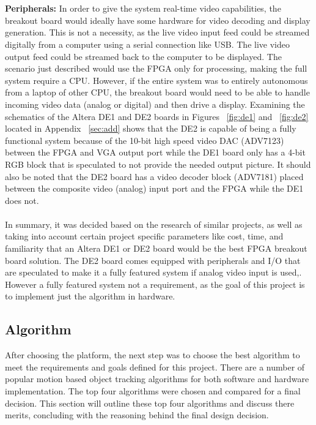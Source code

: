 \documentclass[12pt]{article} %
\begin{document}
\\\\
\textbf{Peripherals:} In order to give the system real-time video capabilities, the breakout board would ideally have some hardware for video decoding and display generation. This is not a necessity, as the live video input feed could be streamed digitally from a computer using  a serial connection like USB. The live video output feed could be streamed back to the computer to be displayed. The scenario just described would use the FPGA only for processing, making the full system require a CPU. However, if the entire system was to entirely autonomous from a laptop of other CPU, the breakout board would need to be able to handle incoming video data (analog or digital) and then drive a display. Examining the schematics of the Altera DE1 and DE2 boards in Figures ~\ref{fig:de1} and ~\ref{fig:de2} located in Appendix ~\ref{sec:add} shows that the DE2 is capable of being a fully functional system because of the 10-bit high speed video DAC (ADV7123) between the FPGA and VGA output port while the DE1 board only has a 4-bit RGB block that is speculated to not provide the needed output picture. It should also be noted that the DE2 board has a video decoder block (ADV7181) placed between the composite video (analog) input port and the FPGA while the DE1 does not.\\\\ 
In summary, it was decided based on the research of similar projects, as well as taking into account certain project specific parameters like cost, time, and familiarity that an Altera DE1 or DE2 board would be the best FPGA breakout board solution. The DE2 board comes equipped with peripherals and I/O that are speculated to make it a fully featured system if analog video input is used,. However a fully featured system not a requirement, as the goal of this project is to implement just the algorithm in hardware.
\subsection{Algorithm}
\label{sec:algorithm}
After choosing the platform, the next step was to choose the best algorithm to meet the requirements and goals defined for this project. There are a number of popular motion based object tracking algorithms for both software and hardware implementation. The top four algorithms were chosen and compared for a final decision. This section will outline these top four algorithms and discuss there merits, concluding with the reasoning behind the final design decision.
\end{document}
